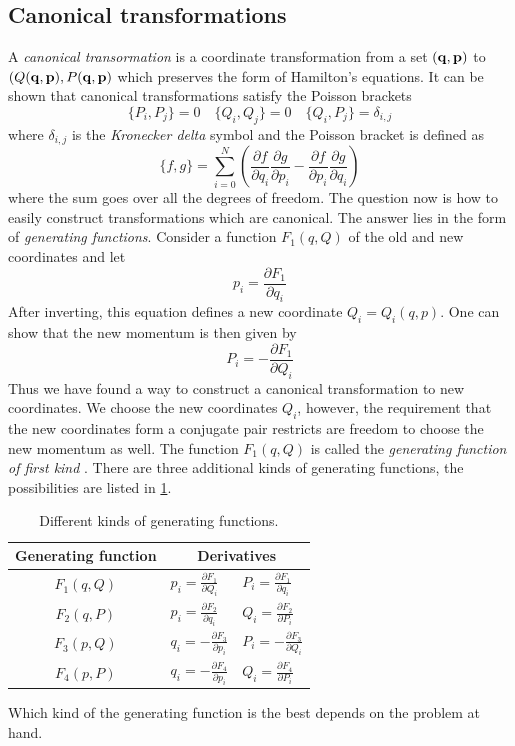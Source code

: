 \subsection{Canonical transformations}
\label{sub:Canonical transformations}
A \emph{canonical transormation} is a coordinate transformation
from a set $(\boldsymbol{\mathbf{q}},\boldsymbol{\mathbf{p}})$ to $(Q(\boldsymbol{\mathbf{q}},\boldsymbol{\mathbf{p}}),
P(\boldsymbol{\mathbf{q}},\boldsymbol{\mathbf{p}})$ which preserves the form of Hamilton's
equations. It can be shown that canonical transformations
satisfy the Poisson brackets
\begin{equation}
    \{P_i,P_j\}=0\quad\{Q_i,Q_j\}=0\quad\{Q_i,P_j\}=\delta_{i,j}
\end{equation}
where $\delta_{i,j}$ is the \emph{Kronecker delta} symbol and
the Poisson bracket is defined as
\begin{equation}
    \{f,g\}=\sum^N_{i=0}\left( \frac{\partial f}{\partial q_i} 
    \frac{\partial g}{\partial p_i} -\frac{\partial f}{\partial p_i} 
    \frac{\partial g}{\partial q_i} \right)
\end{equation}
where the sum goes over all the degrees of freedom. The question now
is how to easily construct transformations which are canonical. The
answer lies in the form of \emph{generating functions}. Consider
a function $F_1(q,Q)$ of the old and new coordinates and let
\begin{equation}
    p_i= \frac{\partial F_1}{\partial q_i} 
\end{equation}
After inverting, this equation defines a new coordinate $Q_i=Q_i(q,p)$.
One can show that the new momentum is then given by
\begin{equation}
    P_i=- \frac{\partial F_1}{\partial Q_i} 
\end{equation}
Thus we have found a way to construct a canonical transformation to new
coordinates. We choose the new coordinates $Q_i$, however, the requirement 
that the new coordinates form a conjugate pair restricts are freedom
to choose the new momentum as well. The function $F_1(q,Q)$ is called
the \emph{generating function of first kind} . There are three additional
kinds of generating functions, the possibilities are listed in 
\cref{tab:generating_functions}.
\begin{table}[h!]
\centering
\begin{tabular}{cll}
\toprule
    Generating function &\multicolumn{2}{c}{Derivatives}\\
\midrule
    $F_1(q,Q)$ & $p_i=\frac{\partial F_1}{\partial Q_i}$ & 
    $P_i=\frac{\partial F_1}{\partial q_i}$\\
    $F_2(q,P)$ & $p_i=\frac{\partial F_2}{\partial q_i}$ & 
    $Q_i=\frac{\partial F_2}{\partial P_i}$\\
    $F_3(p,Q)$ & $q_i=-\frac{\partial F_3}{\partial p_i}$ & 
    $P_i=-\frac{\partial F_3}{\partial Q_i}$\\
    $F_4(p,P)$ & $q_i=-\frac{\partial F_4}{\partial p_i}$ & 
    $Q_i=\frac{\partial F_4}{\partial P_i}$\\
\bottomrule
\end{tabular}
\caption{Different kinds of generating functions.}
\label{tab:generating_functions}
\end{table}
Which kind of the generating function is the best depends on the
problem at hand.

